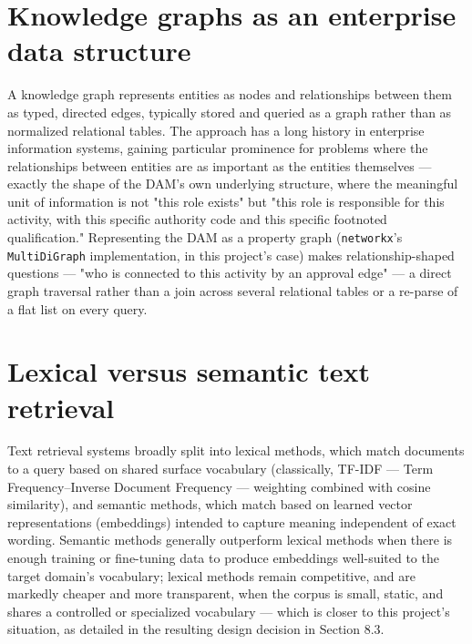 \section{Knowledge graphs as an enterprise data structure}
A knowledge graph represents entities as nodes and relationships between them as typed, directed edges, typically stored and queried as a graph rather than as normalized relational tables. The approach has a long history in enterprise information systems, gaining particular prominence for problems where the relationships between entities are as important as the entities themselves — exactly the shape of the DAM's own underlying structure, where the meaningful unit of information is not "this role exists" but "this role is responsible for this activity, with this specific authority code and this specific footnoted qualification." Representing the DAM as a property graph (\texttt{networkx}'s \texttt{MultiDiGraph} implementation, in this project's case) makes relationship-shaped questions — "who is connected to this activity by an approval edge" — a direct graph traversal rather than a join across several relational tables or a re-parse of a flat list on every query.

\section{Lexical versus semantic text retrieval}
Text retrieval systems broadly split into lexical methods, which match documents to a query based on shared surface vocabulary (classically, TF-IDF — Term Frequency–Inverse Document Frequency — weighting combined with cosine similarity), and semantic methods, which match based on learned vector representations (embeddings) intended to capture meaning independent of exact wording. Semantic methods generally outperform lexical methods when there is enough training or fine-tuning data to produce embeddings well-suited to the target domain's vocabulary; lexical methods remain competitive, and are markedly cheaper and more transparent, when the corpus is small, static, and shares a controlled or specialized vocabulary — which is closer to this project's situation, as detailed in the resulting design decision in Section 8.3.

